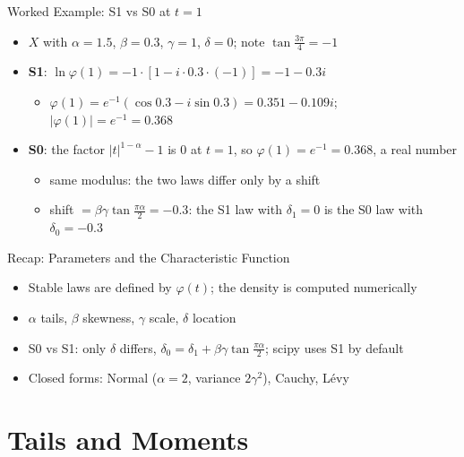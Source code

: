 \begin{frame}{Worked Example: S1 vs S0 at $t = 1$}
\itemsize{\small}
\begin{itemize}
    \item $X$ with $\alpha = 1.5$, $\beta = 0.3$, $\gamma = 1$, $\delta = 0$; note $\tan\frac{3\pi}{4} = -1$
    \item \textbf{S1}: $\ln\varphi(1) = -1\cdot[1 - i \cdot 0.3 \cdot (-1)] = -1 - 0.3i$
    \begin{itemize}
        \item $\varphi(1) = e^{-1}(\cos 0.3 - i \sin 0.3) = 0.351 - 0.109i$; $|\varphi(1)| = e^{-1} = 0.368$
    \end{itemize}
    \item \textbf{S0}: the factor $|t|^{1-\alpha} - 1$ is 0 at $t = 1$, so $\varphi(1) = e^{-1} = 0.368$, a real number
    \begin{itemize}
        \item same modulus: the two laws differ only by a shift
        \item shift $= \beta\gamma\tan\frac{\pi\alpha}{2} = -0.3$: the S1 law with $\delta_1 = 0$ is the S0 law with $\delta_0 = -0.3$
    \end{itemize}
\end{itemize}
\end{frame}

\begin{frame}{Recap: Parameters and the Characteristic Function}
\itemsize{\small}
\begin{itemize}
    \item Stable laws are defined by $\varphi(t)$; the density is computed numerically
    \item $\alpha$ tails, $\beta$ skewness, $\gamma$ scale, $\delta$ location
    \item S0 vs S1: only $\delta$ differs, $\delta_0 = \delta_1 + \beta\gamma\tan\frac{\pi\alpha}{2}$; scipy uses S1 by default
    \item Closed forms: Normal ($\alpha = 2$, variance $2\gamma^2$), Cauchy, Lévy
\end{itemize}
\end{frame}


\section{Tails and Moments}

